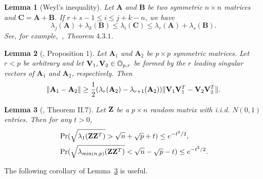 \documentclass[3p]{elsarticle}
\newcommand{\BA}{\mathbf{A}}    \newcommand{\BB}{\mathbf{B}}    \newcommand{\BC}{\mathbf{C}}    \newcommand{\BD}{\mathbf{D}}    \newcommand{\BE}{\mathbf{E}}    \newcommand{\BF}{\mathbf{F}}    \newcommand{\BG}{\mathbf{G}}    \newcommand{\BH}{\mathbf{H}}    \newcommand{\BI}{\mathbf{I}}    \newcommand{\BJ}{\mathbf{J}}    \newcommand{\BK}{\mathbf{K}}    \newcommand{\BL}{\mathbf{L}}
\theoremstyle{plain}
\newtheorem{corollary}{\quad\quad Corollary}
\newtheorem{lemma}{\quad\quad Lemma}
\theoremstyle{definition}
\theoremstyle{remark}
\begin{document}
\begin{appendices}
\begin{lemma}[Weyl's inequality]
Let $\BA$ and $\BB$ be two symmetric $n\times n$ matrices and $\BC=\BA+\BB$. If $r+s-1 \leq  i\leq j+k-n$, we have
\begin{equation*}
\lambda_j(\BA)+\lambda_k(\BB)\leq \lambda_i(\BC) \leq \lambda_r(\BA)+\lambda_s(\BB).
\end{equation*}
    See, for example,~\cite{Horn1985Matrix}, Theorem $4.3.1$.
\end{lemma}

\begin{lemma}[\cite{Cai2015Optimal}, Proposition 1]\label{pert}
    Let $\BA_1$ and $\BA_2$ be $p\times p$ symmetric matrices. Let $r<p$ be arbitrary and let $\mathbf{V}_1, \mathbf{V}_2\in \mathbb{O}_{p,r}$ be formed by the $r$ leading singular vectors of $\BA_1$ and $\BA_2$, respectively.
    Then
    $$
    \|\BA_1-\BA_2\|\geq \frac{1}{2}(\lambda_r(\BA_2)-\lambda_{r+1}(\BA_2))\|\BV_1 \BV_1^T- \BV_2 \BV_2^T\|.
    $$
\end{lemma}


\begin{lemma}[\cite{DAVIDSON2001317}, Theorem II.7]\label{DSbound}
    Let $\mathbf{Z}$ be a $p\times n$ random matrix with i.i.d. $N(0,1)$ entries.
    Then for any $t>0$,
    \begin{align*}
        &\Pr(\sqrt{\lambda_1(\mathbf{Z} \mathbf{Z}^T )}>\sqrt{n}+\sqrt{p}+t)\leq e^{-t^2/2},
        \\
        &\Pr(\sqrt{\lambda_{\min(n,p)}(\mathbf{Z} \mathbf{Z}^T )}<\sqrt{n}-\sqrt{p}-t)\leq e^{-t^2/2}.
    \end{align*}
\end{lemma}
    The following corollary of Lemma~\ref{DSbound} is useful.


\end{appendices}
\end{document}
